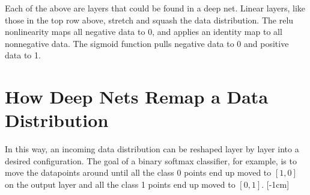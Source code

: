 Each of the above are layers that could be found in a deep net. Linear layers, like those in the top row above, stretch and squash the data distribution. The relu nonlinearity maps all negative data to 0, and applies an identity map to all nonnegative data. The sigmoid function pulls negative data to 0 and positive data to 1.

\section{How Deep Nets Remap a Data Distribution}
In this way, an incoming data distribution can be reshaped layer by layer into a desired configuration. The goal of a binary softmax classifier, for example, is to move the datapoints around until all the class 0 points end up moved to $[1,0]$ on the output layer and all the class 1 points end up moved to $[0,1]$.
[-1cm]

